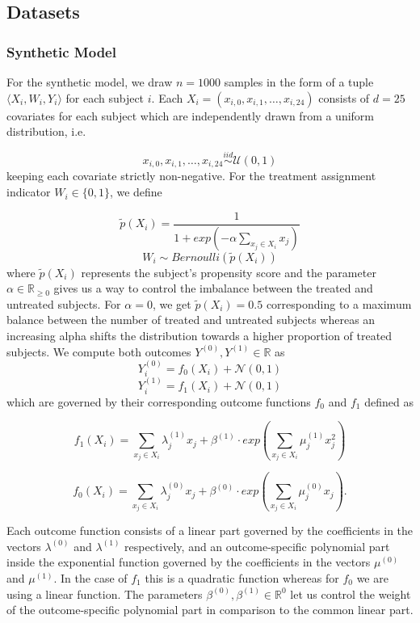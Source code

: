 \subsection{Datasets}
\subsubsection{Synthetic Model}
For the synthetic model, we draw $n = 1000$ samples in the form of a tuple $\langle X_i, W_i, Y_i \rangle$ for each subject $i$. Each $X_i = (x_{i,0}, x_{i,1}, \ldots, x_{i,24})$ consists of $d = 25$ covariates for each subject which are independently drawn from a uniform distribution, i.e.  

$$
x_{i,0}, x_{i,1}, \ldots, x_{i,24} \overset{iid}{\sim} \mathcal{U}(0, 1)
$$
keeping each covariate strictly non-negative. For the treatment assignment indicator $W_i \in \{0,1\}$, we define

$$
\tilde{p}(X_i) =  \frac{1}{1 + exp(- \alpha\sum \limits_{{x_{j} \in X_i}} x_j)} %
$$
$$
W_i \sim Bernoulli(\tilde{p}(X_i))
$$
where $\tilde{p}(X_i)$ represents the subject's propensity score and the parameter $\alpha \in \mathbb{R}_{\geq0}$ gives us a way to control the imbalance between the treated and untreated subjects. For $\alpha = 0$, we get $\tilde{p}(X_i) = 0.5$ corresponding to a maximum balance between the number of treated and untreated subjects whereas an increasing alpha shifts the distribution towards a higher proportion of treated subjects.
We compute both outcomes $Y^{(0)}, Y^{(1)} \in \mathbb{R}$ as
$$
Y^{(0)}_i = f_0(X_i) + \mathcal{N}(0, 1)
$$
$$
Y^{(1)}_i = f_1(X_i) + \mathcal{N}(0, 1)
$$
which are governed by their corresponding outcome functions $f_0$ and $f_1$ defined as


$$
f_1(X_i) = \sum \limits_{{x_{j} \in X_i}} \lambda^{(1)}_j x_j +  \beta^{(1)} \cdot exp(\sum \limits_{{x_{j} \in X_i}} \mu^{(1)}_j x_j^2)
$$

$$
f_0(X_i) = \sum \limits_{{x_{j} \in X_i}} \lambda^{(0)}_j x_j +  \beta^{(0)} \cdot exp(\sum \limits_{{x_{j} \in X_i}} \mu^{(0)}_j x_j).
$$

Each outcome function consists of a linear part governed by the coefficients in the vectors $\lambda^{(0)}$ and $\lambda^{(1)}$ respectively, and an outcome-specific polynomial part inside the exponential function governed by the coefficients in the vectors $\mu^{(0)}$ and $\mu^{(1)}$. In the case of $f_1$ this is a quadratic function whereas for $f_0$ we are using a linear function. The parameters $\beta^{(0)}, \beta^{(1)} \in \mathbb{R}^0$ let us control the weight of the outcome-specific polynomial part in comparison to the common linear part. \\

